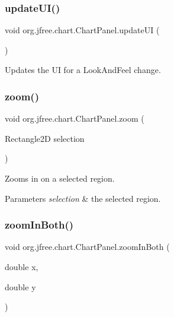 \subsubsection{\texorpdfstring{update\+U\+I()}{updateUI()}}
{\footnotesize\ttfamily void org.\+jfree.\+chart.\+Chart\+Panel.\+update\+UI (\begin{DoxyParamCaption}{ }\end{DoxyParamCaption})}

Updates the UI for a Look\+And\+Feel change. \mbox{\label{classorg_1_1jfree_1_1chart_1_1_chart_panel_a38d1f7fc6721aef92a30c0b79ecdaed9}} 
\subsubsection{\texorpdfstring{zoom()}{zoom()}}
{\footnotesize\ttfamily void org.\+jfree.\+chart.\+Chart\+Panel.\+zoom (\begin{DoxyParamCaption}\item[{Rectangle2D}]{selection }\end{DoxyParamCaption})}

Zooms in on a selected region.


\begin{DoxyParams}{Parameters}
{\em selection} & the selected region. \\
\hline
\end{DoxyParams}
\mbox{\label{classorg_1_1jfree_1_1chart_1_1_chart_panel_a22a96ae585b1776e540b3e5c0f261ec3}} 
\subsubsection{\texorpdfstring{zoom\+In\+Both()}{zoomInBoth()}}
{\footnotesize\ttfamily void org.\+jfree.\+chart.\+Chart\+Panel.\+zoom\+In\+Both (\begin{DoxyParamCaption}\item[{double}]{x,  }\item[{double}]{y }\end{DoxyParamCaption})}

